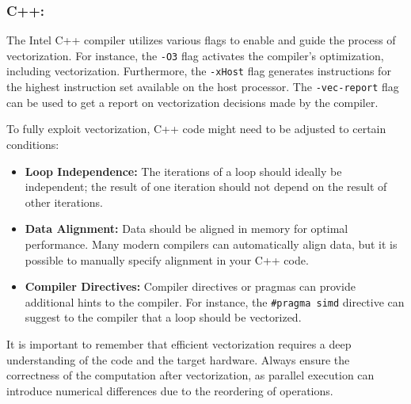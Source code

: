 \subsubsection*{C++:}

The Intel C++ compiler utilizes various flags to enable and guide the process of vectorization. For instance, the \texttt{-O3} flag activates the compiler's optimization, including vectorization. Furthermore, the \texttt{-xHost} flag generates instructions for the highest instruction set available on the host processor. The \texttt{-vec-report} flag can be used to get a report on vectorization decisions made by the compiler.

To fully exploit vectorization, C++ code might need to be adjusted to certain conditions:

\begin{itemize}
\item \textbf{Loop Independence:} The iterations of a loop should ideally be independent; the result of one iteration should not depend on the result of other iterations.
\item \textbf{Data Alignment:} Data should be aligned in memory for optimal performance. Many modern compilers can automatically align data, but it is possible to manually specify alignment in your C++ code.
\item \textbf{Compiler Directives:} Compiler directives or pragmas can provide additional hints to the compiler. For instance, the \texttt{\#pragma simd} directive can suggest to the compiler that a loop should be vectorized.
\end{itemize}

It is important to remember that efficient vectorization requires a deep understanding of the code and the target hardware. Always ensure the correctness of the computation after vectorization, as parallel execution can introduce numerical differences due to the reordering of operations.